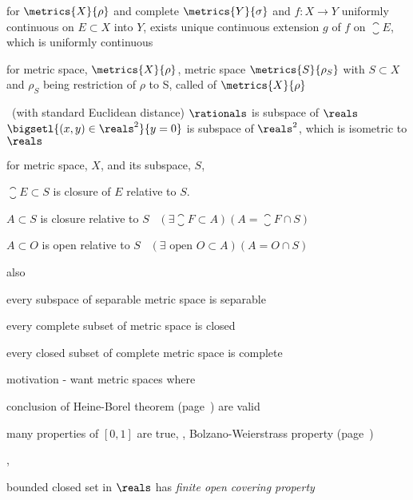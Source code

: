 \documentclass[17pt,landscape]{foils}
\begin{document}
{{	\vitem for $\metrics{X}{\rho}$ and complete $\metrics{Y}{\sigma}$ and $f:X\to Y$ uniformly continuous on $E\subset X$ into $Y$,
		exists unique continuous extension $g$ of $f$ on $\closure{E}$, which is uniformly continuous
\eit



\bit
	\item for metric space, $\metrics{X}{\rho}$,
		metric space $\metrics{S}{\rho_S}$ with $S\subset X$ and $\rho_S$ being restriction of $\rho$ to S,
		called  of $\metrics{X}{\rho}$
	\bit
		\item \eg\ (with standard Euclidean distance)
		\bit
			\iitem $\rationals$ is subspace of $\reals$
			\iitem $\bigsetl{(x,y)\in\reals^2}{y=0}$ is subspace of $\reals^2$, which is isometric to $\reals$
		\eit
	\eit

	\vitem for metric space, $X$, and its subspace, $S$,
	\bit
		\item $\closure{E}\subset S$ is closure of $E$ relative to $S$.
		\item $A\subset S$ is closure relative to $S$ \iaoi\ $(\exists \closure{F}\subset A)(A = \closure{F}\cap S)$
		\item $A\subset O$ is open relative to $S$ \iaoi\ $(\exists \mbox{ open }{O}\subset A)(A = {O}\cap S)$
	\eit

	\vitem also
	\bit
		\item every subspace of separable metric space is separable
		\item every complete subset of metric space is closed
		\item every closed subset of complete metric space is complete
	\eit
\eit



\bit
	\item motivation - want metric spaces where
	\bit
		\item conclusion of Heine-Borel theorem (page~\pageref{page:heine-borel-theorem}) are valid
		\item many properties of $[0,1]$ are true, \eg,
			Bolzano-Weierstrass property
			(page~\pageref{page:bolzano-weierstrass-property-and-sequential-compactness})
	\eit

	\vitem \eg,
	\bit
		\item bounded closed set in $\reals$ has \emph{finite open covering property}
	\eit

}}
\end{document}
